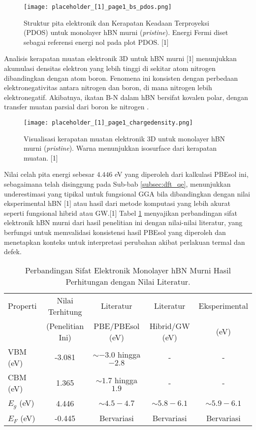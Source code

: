 \begin{figure}[h!]
    \centering
    \texttt{[image: placeholder\_[1]\_page1\_bs\_pdos.png]}
    \caption{Struktur pita elektronik dan Kerapatan Keadaan Terproyeksi (PDOS) untuk monolayer hBN murni (\textit{pristine}). Energi Fermi diset sebagai referensi energi nol pada plot PDOS. [1]}
    \label{fig:hbn_pristine_bs_pdos}
\end{figure}

Analisis kerapatan muatan elektronik 3D untuk hBN murni [1] menunjukkan akumulasi densitas elektron yang lebih tinggi di sekitar atom nitrogen dibandingkan dengan atom boron. Fenomena ini konsisten dengan perbedaan elektronegativitas antara nitrogen dan boron, di mana nitrogen lebih elektronegatif. Akibatnya, ikatan B-N dalam hBN bersifat kovalen polar, dengan transfer muatan parsial dari boron ke nitrogen \cite{[1]}.

\begin{figure}[h!]
    \centering
    \texttt{[image: placeholder\_[1]\_page1\_chargedensity.png]}
    \caption{Visualisasi kerapatan muatan elektronik 3D untuk monolayer hBN murni (\textit{pristine}). Warna menunjukkan isosurface dari kerapatan muatan. [1]}
    \label{fig:hbn_pristine_chargedensity}
\end{figure}

Nilai celah pita energi sebesar $4.446$ eV yang diperoleh dari kalkulasi PBEsol ini, sebagaimana telah disinggung pada Sub-bab \ref{subsec:dft_qe}, menunjukkan underestimasi yang tipikal untuk fungsional GGA bila dibandingkan dengan nilai eksperimental hBN [1] atau hasil dari metode komputasi yang lebih akurat seperti fungsional hibrid atau GW.[1] Tabel \ref{tab:hbn_murni_literatur} menyajikan perbandingan sifat elektronik hBN murni dari hasil penelitian ini dengan nilai-nilai literatur, yang berfungsi untuk memvalidasi konsistensi hasil PBEsol yang diperoleh dan menetapkan konteks untuk interpretasi perubahan akibat perlakuan termal dan defek.

\begin{table}[h!]
  \centering
  \caption{Perbandingan Sifat Elektronik Monolayer hBN Murni Hasil Perhitungan dengan Nilai Literatur.}
  \label{tab:hbn_murni_literatur}
  \begin{tabular}{lcccc}
    \toprule
    Properti & Nilai Terhitung & Literatur & Literatur & Eksperimental \\
             & (Penelitian Ini) & PBE/PBEsol (eV) & Hibrid/GW (eV) & (eV) \\
    \midrule
    VBM (eV) & -3.081 & $\sim -3.0$ hingga $-2.8$ \cite{[1]} & - & - \\
    CBM (eV) &  1.365 & $\sim  1.7$ hingga $ 1.9$ \cite{[1]} & - & - \\
    $E_g$ (eV) &  4.446 & $\sim 4.5-4.7$ \cite{[1, 1]} & $\sim 5.8-6.1$ \cite{[1]} & $\sim 5.9-6.1$ \cite{[1], Watanabe2004} \\
    $E_F$ (eV) & -0.445 & Bervariasi & Bervariasi & Bervariasi \\
    \bottomrule
  \end{tabular}
\end{table}


